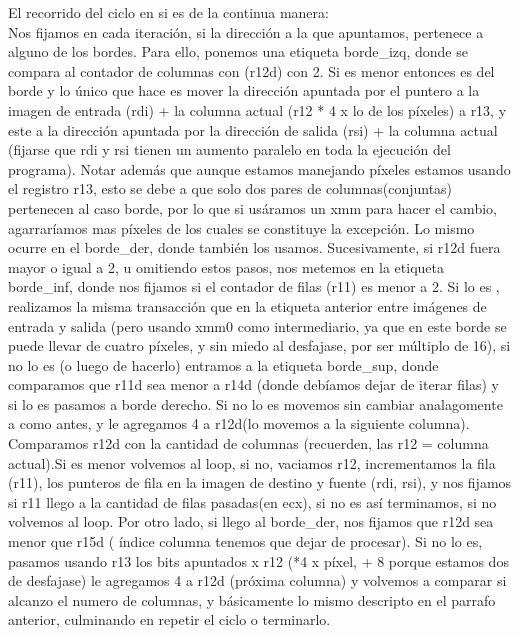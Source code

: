 \documentclass[a4paper]{article}
\begin{document}
        El recorrido del ciclo en si es de la continua manera:
        \hfill \break
        \\
        Nos fijamos en cada iteración, si la dirección a la que apuntamos, pertenece a alguno de los bordes. Para ello, ponemos una etiqueta borde_izq, donde se compara al contador de columnas con (r12d) con 2. Si es menor  entonces es del borde y lo único que hace es mover la dirección apuntada por el puntero a la imagen de entrada (rdi) + la columna actual (r12 * 4 x lo de los píxeles) a r13, y este a la dirección apuntada por la dirección de salida (rsi) + la columna actual  (fijarse  que rdi y rsi tienen un aumento paralelo en toda la ejecución del programa). \hfill \break
Notar además que aunque estamos manejando píxeles estamos usando el registro r13, esto se debe a que solo dos pares de columnas(conjuntas) pertenecen al caso borde, por lo que si usáramos un xmm para hacer el cambio, agarraríamos mas píxeles de los cuales se constituye la excepción. Lo mismo ocurre en el borde_der, donde también los usamos.\hfill \break
        Sucesivamente, si  r12d fuera mayor o igual a 2, u omitiendo estos pasos, nos metemos en la etiqueta borde_inf, donde nos fijamos si el contador de filas (r11) es menor a 2. Si lo es , realizamos la misma transacción que en la etiqueta anterior entre imágenes de entrada y salida (pero usando xmm0 como intermediario, ya que en este borde se puede llevar de cuatro píxeles, y sin miedo al desfajase, por ser múltiplo de 16), si no lo es (o luego de hacerlo) entramos a la etiqueta borde_sup, donde comparamos que r11d sea menor a r14d (donde debíamos dejar de iterar filas)  y   si lo es pasamos a borde derecho. Si no lo es  movemos sin cambiar analagomente a como antes, y le agregamos  4 a r12d(lo movemos a la siguiente columna).\hfill \break
        Comparamos r12d con la cantidad de columnas (recuerden, las r12 = columna actual).Si es menor volvemos al loop, si no, vaciamos r12, incrementamos la fila (r11), los punteros de fila en la imagen de destino y fuente (rdi, rsi), y nos fijamos si r11 llego a la cantidad de filas pasadas(en ecx), si no es así terminamos, si no volvemos al loop. \hfill \break
        Por otro lado, si llego al borde_der, nos fijamos que r12d sea menor que r15d ( índice columna tenemos que dejar de procesar). Si no lo es, pasamos usando r13 los bits apuntados x r12 (*4 x píxel, + 8 porque estamos dos de desfajase)  le agregamos 4 a r12d (próxima columna) y volvemos a comparar si alcanzo el numero de columnas, y básicamente lo mismo descripto en el parrafo anterior, culminando en repetir el ciclo o terminarlo. \hfill \break
\end{document}

